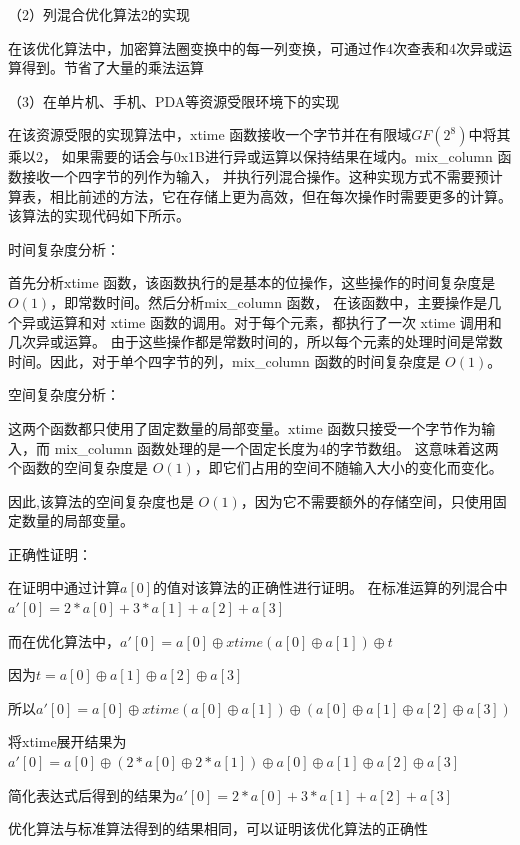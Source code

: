 \documentclass[a4paper,11pt,UTF8]{ctexart}
\begin{document}
            （2）列混合优化算法2的实现\par
            在该优化算法中，加密算法圈变换中的每一列变换，可通过作4次查表和4次异或运算得到。节省了大量的乘法运算
            
\newpage
            （3）在单片机、手机、PDA等资源受限环境下的实现\par
            在该资源受限的实现算法中，xtime 函数接收一个字节并在有限域$GF(2^{8} )$中将其乘以2，
            如果需要的话会与0x1B进行异或运算以保持结果在域内。mix\_column 函数接收一个四字节的列作为输入，
            并执行列混合操作。这种实现方式不需要预计算表，相比前述的方法，它在存储上更为高效，但在每次操作时需要更多的计算。
            该算法的实现代码如下所示。
            

            时间复杂度分析：\par
            首先分析xtime 函数，该函数执行的是基本的位操作，这些操作的时间复杂度是 $O(1)$，即常数时间。然后分析mix\_column 函数，
            在该函数中，主要操作是几个异或运算和对 xtime 函数的调用。对于每个元素，都执行了一次 xtime 调用和几次异或运算。
            由于这些操作都是常数时间的，所以每个元素的处理时间是常数时间。因此，对于单个四字节的列，mix\_column 函数的时间复杂度是 $O(1)$。\par

            空间复杂度分析：\par
            这两个函数都只使用了固定数量的局部变量。xtime 函数只接受一个字节作为输入，而 mix\_column 函数处理的是一个固定长度为4的字节数组。
            这意味着这两个函数的空间复杂度是 $O(1)$，即它们占用的空间不随输入大小的变化而变化。\par
            因此,该算法的空间复杂度也是 $O(1)$，因为它不需要额外的存储空间，只使用固定数量的局部变量。

            正确性证明：\par
            在证明中通过计算$a[0]$的值对该算法的正确性进行证明。
            在标准运算的列混合中$a'[0]=2*a[0]+3*a[1]+a[2]+a[3]$\par
            而在优化算法中，$a'[0]=a[0]\oplus xtime(a[0]\oplus a[1])\oplus t$\par
            因为$t=a[0]\oplus a[1]\oplus a[2]\oplus a[3]$\par
            所以$a'[0]=a[0]\oplus xtime(a[0]\oplus a[1])\oplus (a[0]\oplus a[1]\oplus a[2]\oplus a[3])$\par
            将xtime展开结果为$a'[0]=a[0]\oplus (2*a[0]\oplus 2*a[1])\oplus a[0]\oplus a[1]\oplus a[2]\oplus a[3]$\par
            简化表达式后得到的结果为$a'[0]=2*a[0]+3*a[1]+a[2]+a[3]$\par
            优化算法与标准算法得到的结果相同，可以证明该优化算法的正确性
            
\end{document}
